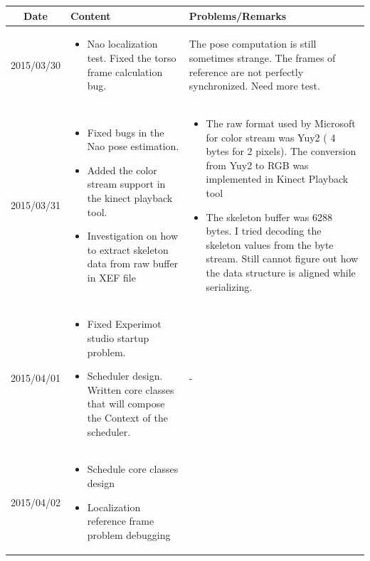 \documentclass[11pt]{article} %
\begin{document}
\begin{center}
    \begin{longtable}{ | c | p{6cm} | p{5cm} |}
    \hline
    Date & Content & Problems/Remarks \\ 
    \endhead
    \hline    
     2015/03/30         & 
  \begin{itemize}
  \item Nao localization test. Fixed the torso frame calculation bug. 
\end{itemize}  
   & The pose computation is still sometimes strange. The frames of reference are not perfectly synchronized. Need more test. \\
\hline
  										 
 2015/03/31         & 
  \begin{itemize}
  \item Fixed bugs in the Nao pose estimation.
  \item Added the color stream support in the kinect playback tool.
  \item Investigation on how to extract skeleton data from raw buffer in XEF file
\end{itemize}   
& 
  \begin{itemize}
  \item The raw format used by Microsoft for color stream was Yuy2 ( 4 bytes for 2 pixels). The conversion from Yuy2 to RGB was implemented in Kinect Playback tool
  \item The skeleton buffer was 6288 bytes. I tried decoding the skeleton values from the byte stream. Still cannot figure out how the data structure is aligned while serializing.
\end{itemize}  \\
\hline
  										 
  
  2015/04/01        & 
  \begin{itemize}
  \item Fixed Experimot studio startup problem.
  \item Scheduler design. Written core classes that will compose the Context of the scheduler.
  \end{itemize}   
  										 & - \\
  \hline
  
  2015/04/02         & 
  \begin{itemize}
  \item Schedule core classes design
  \item Localization reference frame problem debugging
\end{itemize}   
  & 
\\  										 \hline


\end{longtable}
\end{center}
\end{document}
